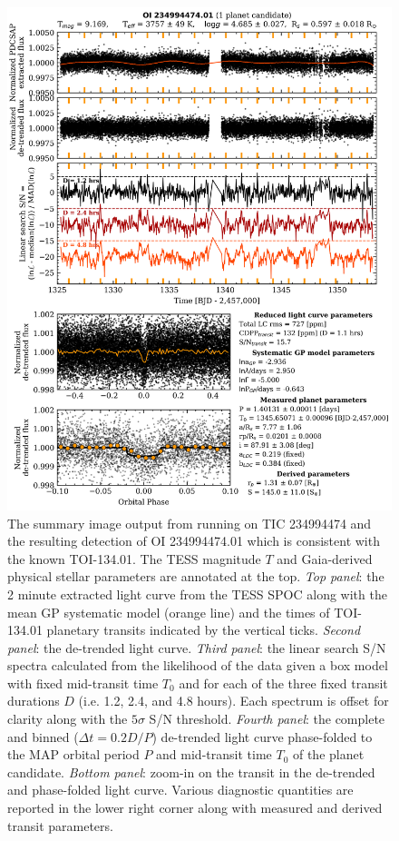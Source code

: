 \begin{figure}
  \centering
  \includegraphics[width=0.8\hsize]{figures/planetcandidatesummary_1_234994474.png}
  \caption[Summary output for TIC 234994474 from \texttt{ORION}.]
          {The summary image output from running \pipeline{} on TIC 234994474 and the resulting
    detection of OI 234994474.01 which is consistent with the known TOI-134.01. The TESS
    magnitude $T$ and Gaia-derived physical stellar parameters 
    are annotated at the top. \emph{Top panel}: the 2 minute extracted light curve from
    the TESS SPOC along with the mean GP systematic model
    (orange line) and the
    times of TOI-134.01 planetary transits indicated by the vertical ticks. \emph{Second panel}: the
    de-trended light curve. \emph{Third panel}: the linear search S/N spectra calculated
    from the likelihood of the data given a box model with fixed mid-transit time $T_0$ and for
    each of the three fixed transit durations $D$ (i.e. 1.2, 2.4, and 4.8 hours).
    Each spectrum is offset for clarity along with the $5\sigma$ S/N threshold.
    \emph{Fourth panel}: the complete and binned ($\Delta t = 0.2D/P$) de-trended light curve
    phase-folded to the MAP orbital period $P$ and mid-transit time $T_0$ of the planet candidate.
    \emph{Bottom panel}: zoom-in on the transit in the de-trended and phase-folded light curve.
    Various diagnostic quantities are reported in the lower right corner along with measured
    and derived transit parameters.}
  \label{fig:summary}
\end{figure}


